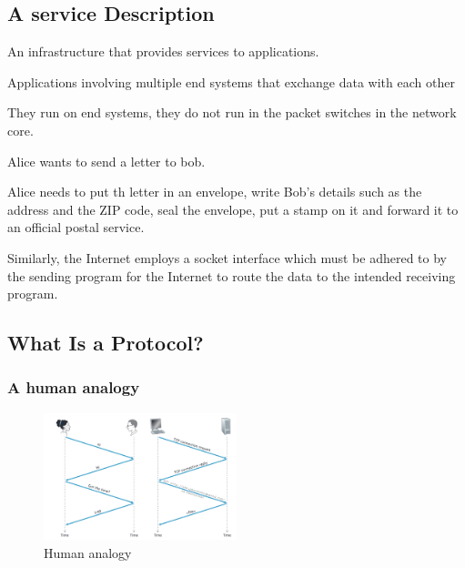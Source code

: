 
\subsection{A service Description}

\begin{definition}\label{def:a_service_description_1}
    An infrastructure that provides services to applications.
\end{definition}

\begin{definition*}
    Applications involving multiple end systems that exchange data with each 
    other
    
    \begin{remark}
        They run on end systems, they do not run in the packet switches in the 
        network core.
    \end{remark}
    
\end{definition*}


\begin{note}\label{note:postal_service_analogy_1}
    Alice wants to send a letter to bob.

    Alice needs to put th letter in an envelope, write Bob's details such as
    the address and the ZIP code, seal the envelope, put a stamp on it and 
    forward it to an official postal service.

    Similarly, the Internet employs a socket interface which must be adhered to 
    by the sending program for the Internet to route the data to the intended 
    receiving program.
\end{note}

\subsection{What Is a Protocol?}

\subsubsection{A human analogy}

\begin{figure}[h]
    \caption{Human analogy}
    \label{fig:human_analogy_1}
    \centering\includegraphics[width=0.5\textwidth]
    {Figures/lec_2_human_analogy.png}
\end{figure}




\newpage












